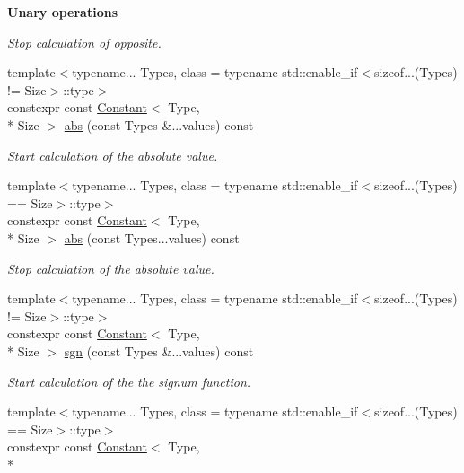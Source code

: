 \begin{Indent}{\bf Unary operations}
\begin{DoxyCompactItemize}
\begin{DoxyCompactList}\small\item\em Stop calculation of opposite. \end{DoxyCompactList}\item 
{\footnotesize template$<$typename... Types, class  = typename std\-::enable\-\_\-if$<$sizeof...(\-Types) != Size$>$\-::type$>$ }\\constexpr const \hyperlink{exceptionmagrathea_1_1Constant}{Constant}$<$ Type, \\*
Size $>$ \hyperlink{exceptionmagrathea_1_1Constant_a26f573ca587ab347511a21ac5f4b34c6}{abs} (const Types \&...values) const 
\begin{DoxyCompactList}\small\item\em Start calculation of the absolute value. \end{DoxyCompactList}\item 
{\footnotesize template$<$typename... Types, class  = typename std\-::enable\-\_\-if$<$sizeof...(\-Types) == Size$>$\-::type$>$ }\\constexpr const \hyperlink{exceptionmagrathea_1_1Constant}{Constant}$<$ Type, \\*
Size $>$ \hyperlink{exceptionmagrathea_1_1Constant_a6358bedf0b2bbb87a6c12048c112537a}{abs} (const Types...\-values) const 
\begin{DoxyCompactList}\small\item\em Stop calculation of the absolute value. \end{DoxyCompactList}\item 
{\footnotesize template$<$typename... Types, class  = typename std\-::enable\-\_\-if$<$sizeof...(\-Types) != Size$>$\-::type$>$ }\\constexpr const \hyperlink{exceptionmagrathea_1_1Constant}{Constant}$<$ Type, \\*
Size $>$ \hyperlink{exceptionmagrathea_1_1Constant_a3f65e411438066260576f883f3e00782}{sgn} (const Types \&...values) const 
\begin{DoxyCompactList}\small\item\em Start calculation of the the signum function. \end{DoxyCompactList}\item 
{\footnotesize template$<$typename... Types, class  = typename std\-::enable\-\_\-if$<$sizeof...(\-Types) == Size$>$\-::type$>$ }\\constexpr const \hyperlink{exceptionmagrathea_1_1Constant}{Constant}$<$ Type, \\*

\end{DoxyCompactItemize}
\end{Indent}
